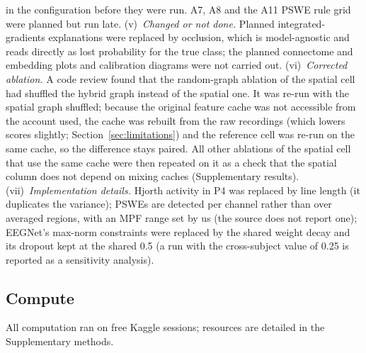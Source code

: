 in the configuration before they were run. A7, A8 and the A11 PSWE rule grid were planned but run late.
(v)~\emph{Changed or not done.} Planned integrated-gradients explanations were replaced by occlusion,
which is model-agnostic and reads directly as lost probability for the true class; the planned connectome and embedding plots and calibration
diagrams were not carried out.
(vi)~\emph{Corrected ablation.} A code review found that the random-graph ablation of the spatial cell had shuffled the hybrid graph instead of the spatial one. It was re-run with the spatial graph shuffled; because the original feature cache was not accessible from the account used, the cache was rebuilt from the raw recordings (which lowers scores slightly; Section~\ref{sec:limitations}) and the reference cell was re-run on the same cache, so the difference stays paired. All other ablations of the spatial cell that use the same cache were then repeated on it as a check that the spatial column does not depend on mixing caches (Supplementary results). (vii)~\emph{Implementation details.} Hjorth activity in P4 was replaced by line length (it duplicates the
variance); PSWEs are detected per channel rather than over averaged regions, with an MPF range set by us
(the source does not report one); EEGNet's max-norm constraints were replaced by the shared weight decay
and its dropout kept at the shared 0.5 (a run with the cross-subject value of 0.25 is reported as a
sensitivity analysis).

\subsection{Compute}
All computation ran on free Kaggle sessions; resources are detailed in the Supplementary methods.

